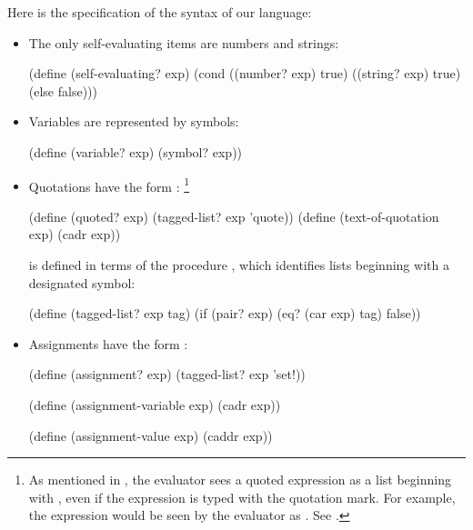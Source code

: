 Here is the specification of the syntax of our language:
\begin{itemize}[leftmargin=*]

	\item
		The only self-evaluating items are numbers and strings:

		\begin{scheme}
		  (define (self-evaluating? exp)
		    (cond ((number? exp) true)
		          ((string? exp) true)
		          (else false)))
		\end{scheme}

	\item
		Variables are represented by symbols:

		\begin{scheme}
		  (define (variable? exp) (symbol? exp))
		\end{scheme}

	\item
		Quotations have the form :%
		\footnote{
			As mentioned in , the evaluator sees a quoted expression as a list beginning with , even if the expression is typed with the quotation mark.
			For example, the expression  would be seen by the evaluator as .
		See .
		}
		\begin{scheme}
		  (define (quoted? exp) (tagged-list? exp 'quote))
		  (define (text-of-quotation exp) (cadr exp))
		\end{scheme}
		 is defined in terms of the procedure , which identifies lists beginning with a designated symbol:
		\begin{scheme}
		  (define (tagged-list? exp tag)
		    (if (pair? exp)
		        (eq? (car exp) tag)
		        false))
		\end{scheme}

	\item
		Assignments have the form :

		\begin{scheme}
		  (define (assignment? exp) (tagged-list? exp 'set!))

		  (define (assignment-variable exp) (cadr exp))

		  (define (assignment-value exp) (caddr exp))
		\end{scheme}


\end{itemize}
